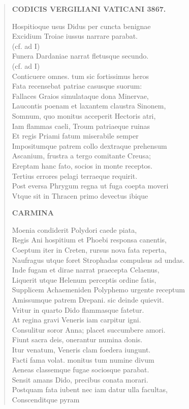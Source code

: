\documentclass[11pt, a4paper]{report}
\begin{document}
\begin{verse}
    \begin{center} \textbf{CODICIS VERGILIANI VATICANI 3867.} \end{center}Hospitioque usus Didus per cuncta benignae \\ Excidium Troiae iussus narrare parabat. \\ (cf. ad I) \\ Funera Dardaniae narrat fletusque secundo. \\ (cf. ad I) \\ Conticuere omnes. tum sic fortissimus heros \\ Fata recensebat patriae casusque suorum: \\ Fallaces Graios simulataque dona Minervae, \\ Laucontis poenam et laxantem claustra Sinonem, \\ Somnum, quo monitus acceperit Hectoris atri, \\ Iam flammas caeli, Troum patriaeque ruinas \\ Et regis Priami fatum miserabile semper \\ Impositumque patrem collo dextraque prehensum \\ Ascanium, frustra a tergo comitante Creusa; \\ Ereptam hanc fato, socios in monte receptos. \\ Tertius errores pelagi terraeque requirit. \\ Post eversa Phrygum regna ut fuga coepta moveri \\ Vtque sit in Thracen primo devectus ibique \\ \begin{center} \textbf{CARMINA} \end{center} \marginpar{[10]} Moenia condiderit Polydori caede piata, \\ Regis Ani hospitium et Phoebi responsa canentis, \\ Coeptum iter in Creten, rursus nova fata reperta, \\ Naufragus utque foret Strophadas compulsus ad undas. \\ Inde fugam et dirae narrat praecepta Celaenus, \\ Liquerit utque Helenum perceptis ordine fatis, \\ Supplicem Achaemeniden Polyphemo urgente receptum \\ Amissumque patrem Drepani. sic deinde quievit. \\ Vritur in quarto Dido flammasque fatetur. \\ At regina gravi Veneris iam carpitur igni. \\ Consulitur soror Anna; placet succumbere amori. \\ Fiunt sacra deis, onerantur numina donis. \\ Itur venatum, Veneris clam foedera iungunt. \\ Facti fama volat. monitus tum numine divum \\ Aeneas classemque fugae sociosque parabat. \\ Sensit amans Dido, precibus conata morari. \\ Postquam fata iubent nec iam datur ulla facultas, \\ Conscenditque pyram 
\end{verse}
\end{document}
